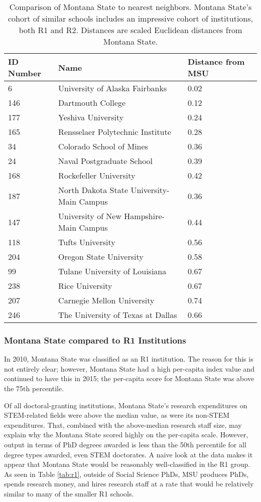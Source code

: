 \documentclass{article}
\begin{document}
\begin{table}[ht]
\centering
\begin{tabular}{|lll|}
  \hline
 ID Number & Name & Distance from MSU \\ 
  \hline
6 & University of Alaska Fairbanks & 0.02 \\ 
146 & Dartmouth College & 0.12 \\ 
177 & Yeshiva University & 0.24 \\ 
 165 & Rensselaer Polytechnic Institute & 0.28 \\ 
 34 & Colorado School of Mines & 0.36 \\ 
 24 & Naval Postgraduate School & 0.39 \\ 
 168 & Rockefeller University & 0.42 \\ 
  187 & North Dakota State University-Main Campus & 0.36 \\ 
  147 & University of New Hampshire-Main Campus & 0.44 \\ 
  118 & Tufts University & 0.56 \\ 
  204 & Oregon State University & 0.58 \\ 
  99 & Tulane University of Louisiana & 0.67 \\ 
  238 & Rice University & 0.67 \\ 
  207 & Carnegie Mellon University & 0.74 \\ 
  246 & The University of Texas at Dallas & 0.66 \\ 
   \hline
\end{tabular}
\caption{\label{tab:nn} Comparison of Montana State to nearest neighbors. Montana State's cohort of similar schools includes an impressive cohort of institutions, both R1 and R2. Distances are scaled Euclidean distances from Montana State. }
\end{table}

\subsubsection{Montana State compared to R1 Institutions}

In 2010, Montana State was classified as an R1 institution. The reason for this is not entirely clear; however, Montana State had a high per-capita index value and continued to have this in 2015; the per-capita score for Montana State was above the 75th percentile.  

Of all doctoral-granting institutions, Montana State's research expenditures on STEM-related fields were above the median value, as were its non-STEM expenditures. That, combined with the above-median research staff size, may explain why the Montana State scored highly on the per-capita scale. However, output in terms of PhD degrees awarded is less than the 50th percentile for all degree types awarded, even STEM doctorates. A naive look at the data makes it appear that Montana State would be reasonably well-classified in the R1 group. As seen in Table \ref{tab:r1}, outside of Social Science PhDs, MSU produces PhDs, spends research money, and hires research staff at a rate that would be relatively similar to many of the smaller R1 schools. 
\end{document}
